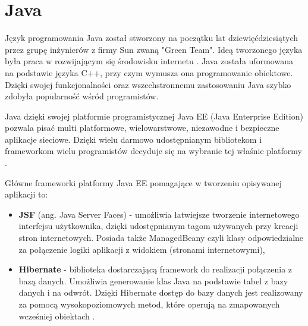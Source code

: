 \section{Java}
\label{sec:java}

Język programowania Java został stworzony na początku lat dziewięćdziesiątych przez grupę inżynierów z firmy Sun zwaną "Green Team". Ideą tworzonego języka była praca w rozwijającym się środowisku internetu \cite{Java01}. Java została uformowana na podstawie języka C++, przy czym wymusza ona programowanie obiektowe. Dzięki swojej funkcjonalności oraz wszechstronnemu zastosowaniu Java szybko zdobyła popularność wśród programistów.

Java dzięki swojej platformie programistycznej Java EE (Java Enterprise Edition) pozwala pisać multi platformowe, wielowarstwowe, niezawodne i bezpieczne aplikacje sieciowe. Dzięki wielu darmowo udostępnianym bibliotekom i frameworkom wielu programistów decyduje się na wybranie tej właśnie platformy \cite{JEE01}. 

Główne frameworki platformy Java EE pomagające w tworzeniu opisywanej aplikacji to:
\begin{itemize}
	\item \textbf{JSF} (ang. Java Server Faces) - umożliwia łatwiejsze tworzenie internetowego interfejsu użytkownika, dzięki udostępnianym tagom używanych przy kreacji stron internetowych. Posiada także ManagedBeany czyli klasy odpowiedzialne za połączenie logiki aplikacji z widokiem (stronami internetowymi),
	\item \textbf{Hibernate} - biblioteka dostarczającą framework do realizacji połączenia z bazą danych. Umożliwia generowanie klas Java na podstawie tabel z bazy danych i na odwrót. Dzięki Hibernate dostęp do bazy danych jest realizowany za pomocą wysokopoziomowych metod, które operują na zmapowanych wcześniej obiektach \cite{HIB01}.
\end{itemize}


